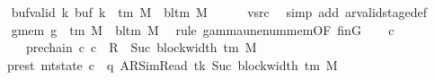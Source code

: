 \begin{isabellebody}
\ \ \isamarkupfalse%
\ buf{\isacharunderscore}{\kern0pt}valid{\isacharcolon}{\kern0pt}\ {\isachardoublequoteopen}{\isasymforall}k{\isachardot}{\kern0pt}\ buf\ k\ {\isasymin}\ {\isasymGamma}{\isacharunderscore}{\kern0pt}tm\ M\ {\isasymunion}\ {\isacharbraceleft}{\kern0pt}bl{\isacharunderscore}{\kern0pt}tm\ M{\isacharbraceright}{\kern0pt}{\isachardoublequoteclose}\isanewline
\ \ \ \ \isamarkupfalse%
\ vsrc\ \isamarkupfalse%
\ {\isacharparenleft}{\kern0pt}simp\ add{\isacharcolon}{\kern0pt}\ ar{\isacharunderscore}{\kern0pt}valid{\isacharunderscore}{\kern0pt}stage{\isacharunderscore}{\kern0pt}def{\isacharparenright}{\kern0pt}\isanewline
\ \ \isamarkupfalse%
\ g{}{\isacharunderscore}{\kern0pt}mem{\isacharcolon}{\kern0pt}\ {\isachardoublequoteopen}{\isacharquery}{\kern0pt}g{}\ {\isasymin}\ {\isasymGamma}{\isacharunderscore}{\kern0pt}tm\ M\ {\isasymunion}\ {\isacharbraceleft}{\kern0pt}bl{\isacharunderscore}{\kern0pt}tm\ M{\isacharbraceright}{\kern0pt}{\isachardoublequoteclose}\ \isamarkupfalse%
\ {\isacharparenleft}{\kern0pt}rule\ gamma{\isacharunderscore}{\kern0pt}unenum{\isacharunderscore}{\kern0pt}mem{\isacharbrackleft}{\kern0pt}OF\ finG{\isacharbrackright}{\kern0pt}{\isacharparenright}{\kern0pt}\isanewline
\ \ \isamarkupfalse%
\ c{}\ \isanewline
\ \ \ \ \ \ pre{\isacharunderscore}{\kern0pt}chain{\isacharcolon}{\kern0pt}\ {\isachardoublequoteopen}{\isacharparenleft}{\kern0pt}c{\isacharprime}{\kern0pt}{\isacharcomma}{\kern0pt}\ c{}{\isacharparenright}{\kern0pt}\ {\isasymin}\ R{\isacharprime}{\kern0pt}\ {\isacharcircum}{\kern0pt}{\isacharcircum}{\kern0pt}\ Suc\ {\isacharparenleft}{\kern0pt}block{\isacharunderscore}{\kern0pt}width\ {\isacharparenleft}{\kern0pt}{\isasymGamma}{\isacharunderscore}{\kern0pt}tm\ M{\isacharparenright}{\kern0pt}{\isacharparenright}{\kern0pt}{\isachardoublequoteclose}\isanewline
\ \ \ pre{\isacharunderscore}{\kern0pt}st{\isacharcolon}{\kern0pt}\ {\isachardoublequoteopen}mt{\isacharunderscore}{\kern0pt}state\ c{}\ {\isacharequal}{\kern0pt}\ {\isacharparenleft}{\kern0pt}q{\isacharcomma}{\kern0pt}\ AR{\isacharunderscore}{\kern0pt}SimRead{\isacharcomma}{\kern0pt}\ tk{\isacharcomma}{\kern0pt}\ Suc\ {\isacharparenleft}{\kern0pt}block{\isacharunderscore}{\kern0pt}width\ {\isacharparenleft}{\kern0pt}{\isasymGamma}{\isacharunderscore}{\kern0pt}tm\ M{\isacharparenright}{\kern0pt}{\isacharparenright}{\kern0pt}{\isacharcomma}{\kern0pt}\isanewline

\end{isabellebody}
